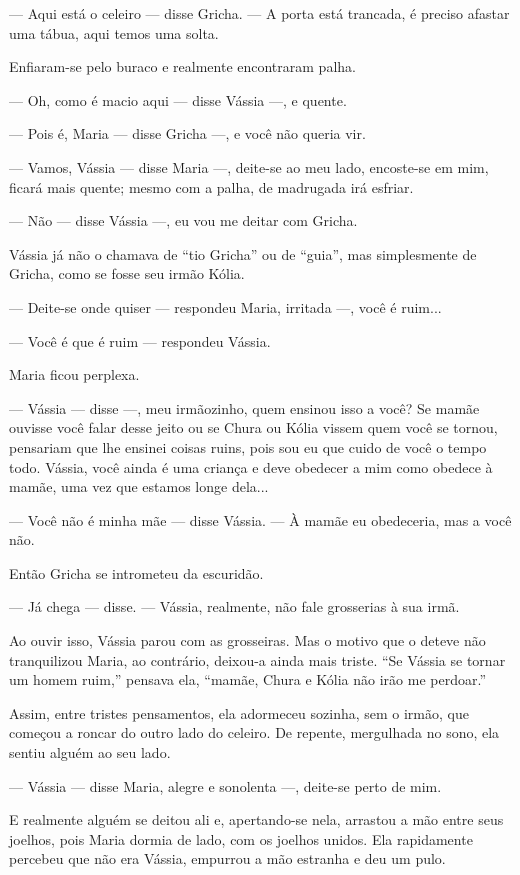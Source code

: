 --- Aqui está o celeiro --- disse Gricha. --- A porta está trancada, é
preciso afastar uma tábua, aqui temos uma solta.

Enfiaram-se pelo buraco e realmente encontraram palha.

--- Oh, como é macio aqui --- disse Vássia ---, e quente.

--- Pois é, Maria --- disse Gricha ---, e você não queria vir.

--- Vamos, Vássia --- disse Maria ---, deite-se ao meu lado, encoste-se
em mim, ficará mais quente; mesmo com a palha, de madrugada irá esfriar.

--- Não --- disse Vássia ---, eu vou me deitar com Gricha.

Vássia já não o chamava de ``tio Gricha'' ou de ``guia'', mas
simplesmente de Gricha, como se fosse seu irmão Kólia.

--- Deite-se onde quiser --- respondeu Maria, irritada ---, você é
ruim...

--- Você é que é ruim --- respondeu Vássia.

Maria ficou perplexa.

--- Vássia --- disse ---, meu irmãozinho, quem ensinou isso a você? Se
mamãe ouvisse você falar desse jeito ou se Chura ou Kólia vissem quem
você se tornou, pensariam que lhe ensinei coisas ruins, pois sou eu que
cuido de você o tempo todo. Vássia, você ainda é uma criança e deve
obedecer a mim como obedece à mamãe, uma vez que estamos longe dela...

--- Você não é minha mãe --- disse Vássia. --- À mamãe eu obedeceria,
mas a você não.

Então Gricha se intrometeu da escuridão.

--- Já chega --- disse. --- Vássia, realmente, não fale grosserias à sua
irmã.

Ao ouvir isso, Vássia parou com as grosseiras. Mas o motivo que o deteve
não tranquilizou Maria, ao contrário, deixou-a ainda mais triste. ``Se
Vássia se tornar um homem ruim,'' pensava ela, ``mamãe, Chura e Kólia
não irão me perdoar.''

Assim, entre tristes pensamentos, ela adormeceu sozinha, sem o irmão,
que começou a roncar do outro lado do celeiro. De repente, mergulhada no
sono, ela sentiu alguém ao seu lado.

--- Vássia --- disse Maria, alegre e sonolenta ---, deite-se perto de
mim.

E realmente alguém se deitou ali e, apertando-se nela, arrastou a mão
entre seus joelhos, pois Maria dormia de lado, com os joelhos unidos.
Ela rapidamente percebeu que não era Vássia, empurrou a mão estranha e
deu um pulo.

